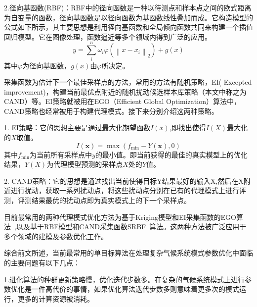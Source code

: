 2.径向基函数(RBF)：RBF中的径向函数是一种以待测点和样本点之间的欧式距离为自变量的函数，径向基函数是以径向函数为基函数线性叠加而成。它构造模型的公式如下所示，其主要思想是利用径向基函数和全局倾向函数共同来构建一个插值回归模型。它在图像处理，函数逼近等多个领域内得到广泛的应用。
\begin{equation}
y = \sum _ { i } ^ { n } \omega _ { i } \dot \varphi \left( \left\| x - x _ { i } \right\| _ { 2 } \right) + g ( x )
\end{equation}
其中$\varphi$为径向基函数，$g (x)$由$\varphi$所决定。

采集函数为估计下一个最佳采样点的方法，常用的方法有随机策略，EI( Excepted improvement)，构建当前最优点附近的随机扰动候选样本库策略（本文中称之为CAND）等。EI策略就被用在EGO（Efficient Global Optimization）算法中，CAND策略也经常被用于构建代理模式。接下来分别介绍这两种策略。

1. EI策略：它的思想主要是通过最大化期望函数$I(x)$,即找出使得$I(X)$最大化的$X$取值。
\begin{equation}
I ( \mathbf { x } ) = \max \left( f _ { \min } - Y ( \mathbf { x } ) , 0 \right)   
\end{equation}
其中$ f _ { \min }$为当前所有采样点中$y$的最小值。即当前获得的最佳的真实模型上的优化结果，$Y(X)$为代理模型预测的采样点$X$处的$Y$值。

2. CAND策略：它的思想是通过找出当前使得目标Y结果最好的输入X,然后在X附近进行扰动，获取一系列扰动点，将这些扰动点分别在已有的代理模式上进行评测，评测结果最优的扰动点即为真实模式上的下一个采样点。

目前最常用的两种代理模式优化方法为基于Kriging模型和EI采集函数的EGO算法~\cite{mohammadi2016kriging},以及基于RBF模型和CAND采集函数SRBF~\cite{regis2007stochastic}算法。这两种方法被广泛应用于多个领域的建模及参数优化工作。


综合前文所述，当前最常用的单目标算法在处理复杂气候系统模式参数优化中面临的主要问题有以下几点：

1.进化算法的种群更新策略慢，优化迭代步数多。在复杂的气候系统模式上进行参数优化是一件高代价的事情，如果优化算法迭代步数多则意味着更多次的模式运行，更多的计算资源被消耗。

